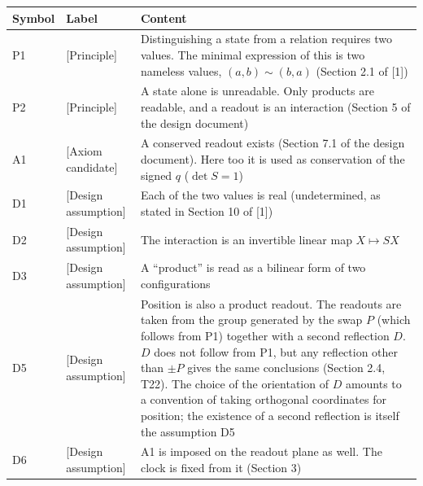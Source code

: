 \documentclass[
  a4paper,
]{article}
\newcounter{none} %
\begin{document}
{\def\LTcaptype{none} %
\begin{longtable}[]{@{}
  >{\raggedright\arraybackslash}p{}
  >{\raggedright\arraybackslash}p{}
  >{\raggedright\arraybackslash}p{}@{}}
\toprule\noalign{}
\begin{minipage}[b]{\linewidth}\raggedright
Symbol
\end{minipage} & \begin{minipage}[b]{\linewidth}\raggedright
Label
\end{minipage} & \begin{minipage}[b]{\linewidth}\raggedright
Content
\end{minipage} \\
\midrule\noalign{}
\endhead
\bottomrule\noalign{}
\endlastfoot
P1 & {[}Principle{]} & Distinguishing a state from a relation requires
two values. The minimal expression of this is two nameless values,
\((a,b)\sim(b,a)\) (Section 2.1 of {[}1{]}) \\
P2 & {[}Principle{]} & A state alone is unreadable. Only products are
readable, and a readout is an interaction (Section 5 of the design
document) \\
A1 & {[}Axiom candidate{]} & A conserved readout exists (Section 7.1 of
the design document). Here too it is used as conservation of the signed
\(q\) (\(\det S=1\)) \\
D1 & {[}Design assumption{]} & Each of the two values is real
(undetermined, as stated in Section 10 of {[}1{]}) \\
D2 & {[}Design assumption{]} & The interaction is an invertible linear
map \(X\mapsto SX\) \\
D3 & {[}Design assumption{]} & A ``product'' is read as a bilinear form
of two configurations \\
D5 & {[}Design assumption{]} & Position is also a product readout. The
readouts are taken from the group generated by the swap \(P\) (which
follows from P1) together with a second reflection \(D\). \(D\) does not
follow from P1, but any reflection other than \(\pm P\) gives the same
conclusions (Section 2.4, T22). The choice of the orientation of \(D\)
amounts to a convention of taking orthogonal coordinates for position;
the existence of a second reflection is itself the assumption D5 \\
D6 & {[}Design assumption{]} & A1 is imposed on the readout plane as
well. The clock is fixed from it (Section 3) \\
\end{longtable}
}
\end{document}
